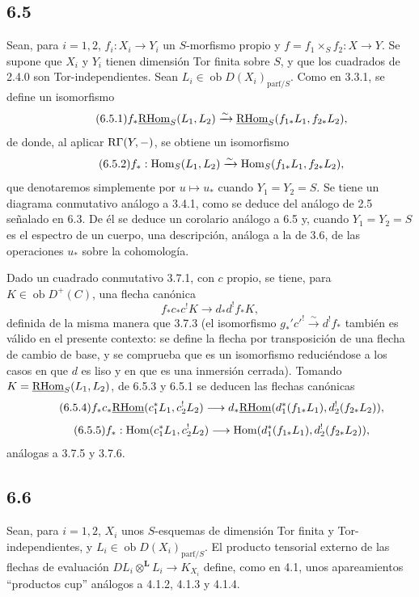 \subsection*{6.5}
Sean, para $i=1,2$, $f_i:X_i\to Y_i$ un $S$-morfismo propio y $f=f_1\times_Sf_2:X\to Y$. Se supone que $X_i$ y $Y_i$ tienen dimensión Tor finita sobre $S$, y que los cuadrados de 2.4.0 son Tor-independientes. Sean $L_i\in\operatorname{ob}D(X_i)_{\mathrm{parf}/S}$. Como en 3.3.1, se define un isomorfismo
\begin{equation}
\tag{6.5.1}
f_*\underline{\mathrm{RHom}}_S(L_1,L_2)\xrightarrow{\sim}\underline{\mathrm{RHom}}_S(f_{1*}L_1,f_{2*}L_2),
\end{equation}
de donde, al aplicar $\mathrm{R}\Gamma(Y,-)$, se obtiene un isomorfismo
\begin{equation}
\tag{6.5.2}
f_*:\operatorname{Hom}_S(L_1,L_2)\xrightarrow{\sim}\operatorname{Hom}_S(f_{1*}L_1,f_{2*}L_2),
\end{equation}
que denotaremos simplemente por $u\mapsto u_*$ cuando $Y_1=Y_2=S$. Se tiene un diagrama conmutativo análogo a 3.4.1, como se deduce del análogo de 2.5 señalado en 6.3. De él se deduce un corolario análogo a 6.5 y, cuando $Y_1=Y_2=S$ es el espectro de un cuerpo, una descripción, análoga a la de 3.6, de las operaciones $u_*$ sobre la cohomología.

Dado un cuadrado conmutativo 3.7.1, con $c$ propio, se tiene, para $K\in\operatorname{ob}D^+(C)$, una flecha canónica
\begin{equation}
\tag{6.5.3}
f_*c_*c^!K\longrightarrow d_*d^!f_*K,
\end{equation}
definida de la misma manera que 3.7.3 (el isomorfismo $g_*'c'^!\xrightarrow{\sim}d^!f_*$ también es válido en el presente contexto: se define la flecha por transposición de una flecha de cambio de base, y se comprueba que es un isomorfismo reduciéndose a los casos en que $d$ es liso y en que es una inmersión cerrada). Tomando $K=\underline{\mathrm{RHom}}_S(L_1,L_2)$, de 6.5.3 y 6.5.1 se deducen las flechas canónicas
\begin{equation}
\tag{6.5.4}
f_*c_*\underline{\mathrm{RHom}}(c_1^*L_1,c_2^!L_2)\longrightarrow d_*\underline{\mathrm{RHom}}(d_1^*(f_{1*}L_1),d_2^!(f_{2*}L_2)),
\end{equation}
\begin{equation}
\tag{6.5.5}
f_*:\operatorname{Hom}(c_1^*L_1,c_2^!L_2)\longrightarrow\operatorname{Hom}(d_1^*(f_{1*}L_1),d_2^!(f_{2*}L_2)),
\end{equation}
análogas a 3.7.5 y 3.7.6.

\subsection*{6.6}
Sean, para $i=1,2$, $X_i$ unos $S$-esquemas de dimensión Tor finita y Tor-independientes, y $L_i\in\operatorname{ob}D(X_i)_{\mathrm{parf}/S}$. El producto tensorial externo de las flechas de evaluación $DL_i\otimes^{\mathbf L}L_i\to K_{X_i}$ define, como en 4.1, unos apareamientos ``productos cup'' análogos a 4.1.2, 4.1.3 y 4.1.4.


